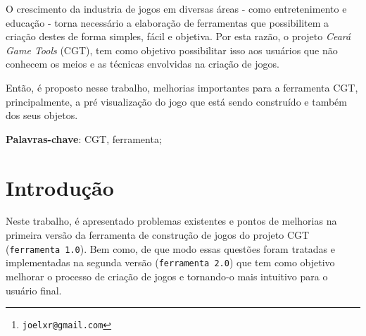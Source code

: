 \documentclass[12pt,twoside,openright,a4paper,english,brazil,sumario=tradicional]{abntex2}
\author{Joel Xavier Rocha\thanks{\texttt{joelxr@gmail.com}}}
\begin{document}
\lstset{
        frame=single,
        showlines=true,
        language=java,
        tabsize=3,
        basicstyle=\scriptsize
        }
\frenchspacing
\imprimircapa
\imprimirfolhaderosto*

%     

% 

\begin{agradecimentos}

\end{agradecimentos}
\setlength{\absparsep}{18pt}
\begin{resumo}
   O crescimento da industria de jogos em diversas áreas - como entretenimento e educação - torna necessário a elaboração de ferramentas que possibilitem a criação destes de forma simples, fácil e objetiva. Por esta razão, o projeto \emph{Ceará Game Tools} (CGT), tem como objetivo possibilitar isso aos usuários que não conhecem os meios e as técnicas envolvidas na criação de jogos.

   Então, é proposto nesse trabalho, melhorias importantes para a ferramenta CGT, principalmente, a pré visualização do jogo que está sendo construído e também dos seus objetos.

   \vspace{\onelineskip}
   \noindent
   \textbf{Palavras-chave}: CGT, ferramenta;
\end{resumo}
\listoffigures*
\cleardoublepage
{}
\listoftables*
\cleardoublepage
{}
\tableofcontents*
\cleardoublepage
\textual
\chapter{Introdução} %
\label{chap:introducao}
Neste trabalho, é apresentado problemas existentes e pontos de melhorias na primeira versão da ferramenta de construção de jogos do projeto CGT (\texttt{ferramenta 1.0}). Bem como, de que modo essas questões foram tratadas e implementadas na segunda versão (\texttt{ferramenta 2.0}) que tem como objetivo melhorar o processo de criação de jogos e tornando-o mais intuitivo para o usuário final.
\end{document}
